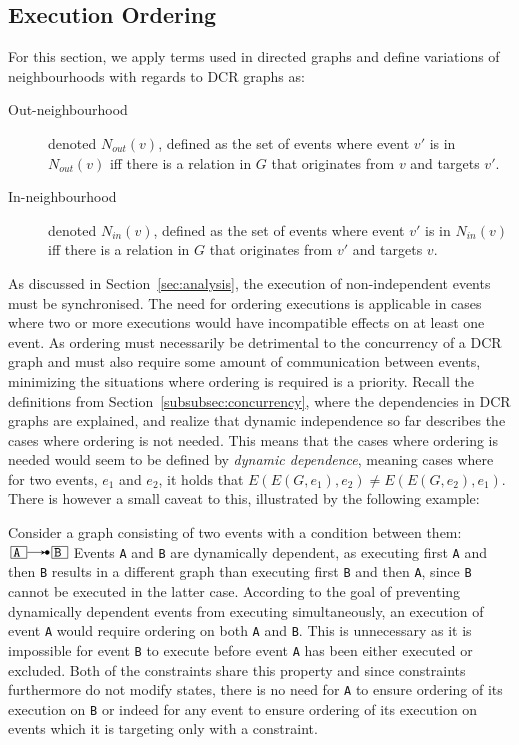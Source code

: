 \documentclass{article}
\begin{document}
	\subsection{Execution Ordering}
	\label{subsec:execution-ordering}

	For this section, we apply terms used in directed graphs and define variations of neighbourhoods with regards to DCR graphs as:
	\begin{description}
		\item[Out-neighbourhood] denoted $N_{out}(v)$, defined as the set of events where event $v'$ is in $N_{out}(v)$ iff there is a relation in $G$ that originates from $v$ and targets $v'$.
		\item[In-neighbourhood] denoted $N_{in}(v)$, defined as the set of events where event $v'$ is in $N_{in}(v)$ iff there is a relation in $G$ that originates from $v'$ and targets $v$.
	\end{description}

	As discussed in Section~\ref{sec:analysis}, the execution of non-independent events must be synchronised.
	The need for ordering executions is applicable in cases where two or more executions would have incompatible effects on at least one event.
	As ordering must necessarily be detrimental to the concurrency of a DCR graph and must also require some amount of communication between events, minimizing the situations where ordering is required is a priority.
	Recall the definitions from Section~\ref{subsubsec:concurrency}, where the dependencies in DCR graphs are explained, and realize that dynamic independence so far describes the cases where ordering is not needed.
	This means that the cases where ordering is needed would seem to be defined by \textit{dynamic dependence}, meaning cases where for two events, $e_1$ and $e_2$, it holds that $E(E(G, e_1),e_2) \neq E(E(G, e_2),e_1)$.
	There is however a small caveat to this, illustrated by the following example:

	Consider a graph consisting of two events with a condition between them: $\ev{A} \crel \ev{B}$
	Events \texttt{A} and \texttt{B} are dynamically dependent, as executing first \texttt{A} and then \texttt{B} results in a different graph than executing first \texttt{B} and then \texttt{A}, since \texttt{B} cannot be executed in the latter case.
	According to the goal of preventing dynamically dependent events from executing simultaneously, an execution of event \texttt{A} would require ordering on both \texttt{A} and \texttt{B}.
	This is unnecessary as it is impossible for event \texttt{B} to execute before event \texttt{A} has been either executed or excluded.
	Both of the constraints share this property and since constraints furthermore do not modify states, there is no need for \texttt{A} to ensure ordering of its execution on \texttt{B} or indeed for any event to ensure ordering of its execution on events which it is targeting only with a constraint.
\end{document}
